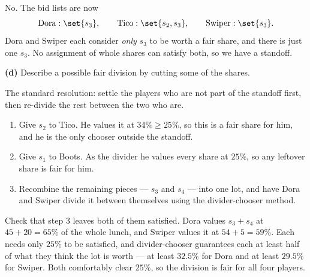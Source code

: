 \documentclass[12pt]{ximera}
\begin{document}
\begin{problem}
\begin{prompt}
\begin{solution}
No. The bid lists are now
\[
\text{Dora}: \set{s_3}, \qquad \text{Tico}: \set{s_2, s_3}, \qquad
\text{Swiper}: \set{s_3}.
\]
Dora and Swiper each consider \emph{only} $s_3$ to be worth a fair share, and there is
just one $s_3$. No assignment of whole shares can satisfy both, so we have a standoff.
\end{solution}
\end{prompt}

\begin{prompt}
\textbf{(d)} Describe a possible fair division by cutting some of the shares.

\begin{freeResponse}
\end{freeResponse}

\begin{solution}
The standard resolution: settle the players who are not part of the standoff first,
then re-divide the rest between the two who are.

\begin{enumerate}
\item Give $s_2$ to Tico. He values it at $34\% \ge 25\%$, so this is a fair share for
      him, and he is the only chooser outside the standoff.
\item Give $s_1$ to Boots. As the divider he values every share at $25\%$, so any
      leftover share is fair for him.
\item Recombine the remaining pieces --- $s_3$ and $s_4$ --- into one lot, and have
      Dora and Swiper divide it between themselves using the divider-chooser method.
\end{enumerate}

Check that step 3 leaves both of them satisfied. Dora values $s_3 + s_4$ at
$45+20 = 65\%$ of the whole lunch, and Swiper values it at $54+5 = 59\%$. Each needs
only $25\%$ to be satisfied, and divider-chooser guarantees each at least half of what
they think the lot is worth --- at least $32.5\%$ for Dora and at least $29.5\%$ for
Swiper. Both comfortably clear $25\%$, so the division is fair for all four players.
\end{solution}
\end{prompt}
\end{problem}
\end{document}
